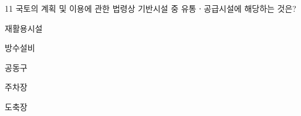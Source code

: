 \begin{question}{11}
국토의 계획 및 이용에 관한 법령상 기반시설 중 유통ㆍ공급시설에 해당하는 것은?
\begin{choices}
  \item 재활용시설
  \item 방수설비
  \item 공동구
  \item 주차장
  \item 도축장
\end{choices}
\end{question}
